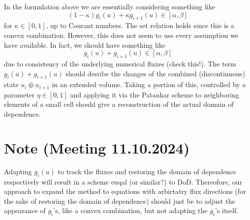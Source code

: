 \documentclass[]{article}
\begin{document}
In the formulation above we are essentially considering something like
\begin{displaymath}
(1-\kappa)g_i(u) + \kappa g_{i+1}(u) \in [\alpha, \beta]
\end{displaymath}
for $\kappa \in [0, 1]$, up to Courant numbers. The set relation holds since this is a convex combination. However, this does not seem to use every assumption we have available. In fact, we should have something like
\begin{displaymath}
	g_i(u) + g_{i+1}(u) \in [\alpha, \beta]
\end{displaymath}
due to consistency of the underlying numerical fluxes (check this!). The term $g_i(u) + g_{i+1}(u)$ should desribe  the changes of the combined (discontinuous) state $u_i \oplus u_{i+1}$ in an extended volume. Taking a portion of this, controlled by a parameter $\eta \in [0, 1]$ and applying it via the Patankar scheme to neighboring elements of a small cell should give a reconstruction of the actual domain of dependence.

\section{Note (Meeting 11.10.2024)}
Adapting $g_i(u)$ to track the fluxes and restoring the domain of dependence respectively will result in a scheme euqal (or similar?) to DoD. 
Thereofore, our approach to expand the method to equations with arbirtatry flux directions (for the sake of restoring the domain of dependence) should just be to adjust the appearance of $g_i$'s, like a convex combination, but not adapting the $g_i$'s itself.
\end{document}
